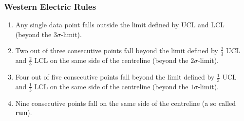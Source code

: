 \documentclass[11pt]{article}
\theoremstyle{definition}
\begin{document}
\subsubsection{Western Electric Rules}
\begin{enumerate}
	\item Any single data point falls outside the limit defined by UCL and LCL (beyond the $3\sigma$-limit).
	\item Two out of three consecutive points fall beyond the limit defined by $\frac{2}{3}$ UCL and $\frac{2}{3}$ LCL on the same side of the centreline (beyond the $2\sigma$-limit).
	\item  Four out of five consecutive points fall beyond the limit defined by $\frac{1}{3}$ UCL and $\frac{1}{3}$ LCL on the same side of the centreline (beyond the $1\sigma$-limit).
	\item Nine consecutive points fall on the same side of the centreline (a so called \textbf{run}).
\end{enumerate}
\end{document}
